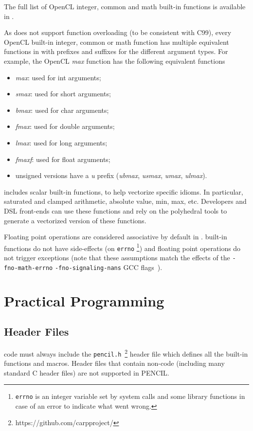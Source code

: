 The full list of OpenCL integer, common and math built-in functions is
available in \cite{opencl-1.2}.

As \pencil does not support function overloading (to be consistent
with C99), every OpenCL built-in integer, common or math function
has multiple equivalent functions in \pencil with prefixes and
suffixes for the different argument types.
For example, the OpenCL \emph{max} function has the
following equivalent \pencil functions
\begin{itemize}
 \item \emph{max}: used for int arguments;
 \item \emph{smax}: used for short arguments;
 \item \emph{bmax}: used for char arguments;
 \item \emph{fmax}: used for double arguments;
 \item \emph{lmax}: used for long arguments;
 \item \emph{fmaxf}: used for float arguments;
 \item unsigned versions have a \emph{u} prefix
 (\emph{ubmax}, \emph{usmax}, \emph{umax}, \emph{ulmax}).
\end{itemize}

\pencil includes scalar built-in functions, to help vectorize specific
idioms. In particular, saturated and clamped arithmetic, absolute
value, min, max, etc.  Developers and DSL front-ends can use these
functions and rely on the polyhedral tools to generate a vectorized
version of these functions.

Floating point operations are considered associative by default in \pencil.
\pencil built-in functions do not have side-effects (on \texttt{errno}
\footnote{\texttt{errno} is an integer variable set by system calls and
some library functions in case of an error to indicate what went wrong.})
and floating point operations do not trigger exceptions (note that these
assumptions match the effects of the \texttt{-fno-math-errno}
\texttt{-fno-signaling-nans} GCC flags~\cite{gccguide}).

\section{Practical \pencil Programming}

\subsection{Header Files}
\pencil code must always include
the \texttt{pencil.h}~\footnote{https://github.com/carpproject/} header file
which defines all the \pencil built-in functions and macros.
Header files that contain non-\pencil code (including many standard C header
files) are not supported in PENCIL.


